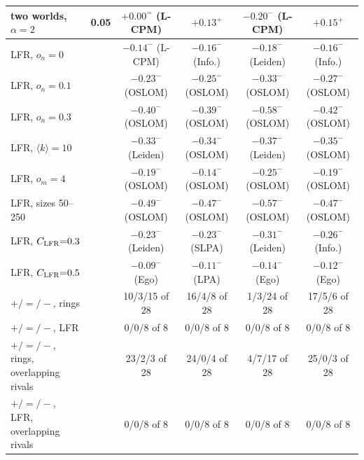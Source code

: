 \begin{table}[t]
\begin{ruledtabular}
\begin{tabular}{llcccc}
two worlds, $\alpha{=}2$ & 0.05 & $+0.00^{=}$ (L-CPM) & $+0.13^{+}$ & $-0.20^{-}$ (L-CPM) & $+0.15^{+}$ \\
\hline
LFR, $o_n{=}0$ &  & $-0.14^{-}$ (L-CPM) & $-0.16^{-}$ (Info.) & $-0.18^{-}$ (Leiden) & $-0.16^{-}$ (Info.) \\
LFR, $o_n{=}0.1$ &  & $-0.23^{-}$ (OSLOM) & $-0.25^{-}$ (OSLOM) & $-0.33^{-}$ (OSLOM) & $-0.27^{-}$ (OSLOM) \\
LFR, $o_n{=}0.3$ &  & $-0.40^{-}$ (OSLOM) & $-0.39^{-}$ (OSLOM) & $-0.58^{-}$ (OSLOM) & $-0.42^{-}$ (OSLOM) \\
LFR, $\langle k\rangle{=}10$ &  & $-0.33^{-}$ (Leiden) & $-0.34^{-}$ (OSLOM) & $-0.37^{-}$ (Leiden) & $-0.35^{-}$ (OSLOM) \\
LFR, $o_m{=}4$ &  & $-0.19^{-}$ (OSLOM) & $-0.14^{-}$ (OSLOM) & $-0.25^{-}$ (OSLOM) & $-0.19^{-}$ (OSLOM) \\
LFR, sizes 50--250 &  & $-0.49^{-}$ (OSLOM) & $-0.47^{-}$ (OSLOM) & $-0.57^{-}$ (OSLOM) & $-0.47^{-}$ (OSLOM) \\
LFR, $C_{\rm LFR}{=}0.3$ &  & $-0.23^{-}$ (Leiden) & $-0.23^{-}$ (SLPA) & $-0.31^{-}$ (Leiden) & $-0.26^{-}$ (Info.) \\
LFR, $C_{\rm LFR}{=}0.5$ &  & $-0.09^{-}$ (Ego) & $-0.11^{-}$ (LPA) & $-0.14^{-}$ (Ego) & $-0.12^{-}$ (Ego) \\
\hline
$+/{=}/-$, rings & & 10/3/15 of 28 & 16/4/8 of 28 & 1/3/24 of 28 & 17/5/6 of 28 \\
$+/{=}/-$, LFR & & 0/0/8 of 8 & 0/0/8 of 8 & 0/0/8 of 8 & 0/0/8 of 8 \\
$+/{=}/-$, rings, overlapping rivals & & 23/2/3 of 28 & 24/0/4 of 28 & 4/7/17 of 28 & 25/0/3 of 28 \\
$+/{=}/-$, LFR, overlapping rivals & & 0/0/8 of 8 & 0/0/8 of 8 & 0/0/8 of 8 & 0/0/8 of 8 \\
\end{tabular}
\end{ruledtabular}
\end{table}
